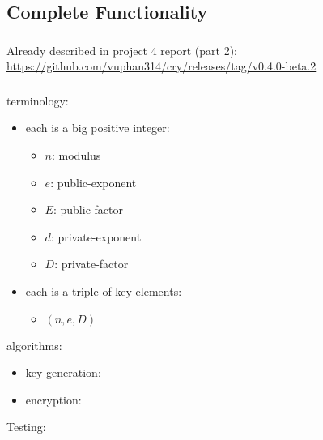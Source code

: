 \subsection{Complete Functionality}


\subsubsection{\rsa{} \cs}

Already described in project 4 report (part 2):
\url{https://github.com/vuphan314/cry/releases/tag/v0.4.0-beta.2}

\subsubsection{\dummy{} \cs}

terminology:
\begin{itemize}
\item each  is a big positive integer:
  \begin{itemize}
  \item $n$: modulus
  \item $e$: public-exponent
  \item $E$: public-factor
  \item $d$: private-exponent
  \item $D$: private-factor
  \end{itemize}
\item each  is a triple of key-elements:
  \begin{itemize}
  \item $(n, e, D)$
  \end{itemize}
\end{itemize}

algorithms:
\begin{itemize}
\item key-generation:
\item encryption:
\end{itemize}

Testing:
\codes{}

\subsubsection{\cry{} \cf}

\codes{}
